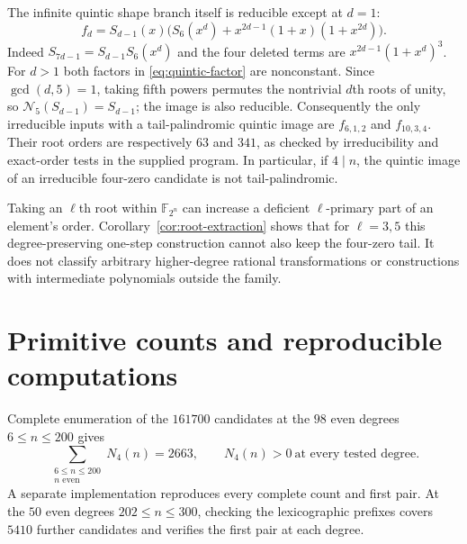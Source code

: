 \documentclass[11pt]{article}
\theoremstyle{definition}
\theoremstyle{remark}
\begin{document}
The infinite quintic shape branch itself is reducible except at $d=1$:
\begin{equation}\label{eq:quintic-factor}
 f_d=S_{d-1}(x)
       \bigl(S_6(x^d)+x^{2d-1}(1+x)(1+x^{2d})\bigr).
\end{equation}
Indeed $S_{7d-1}=S_{d-1}S_6(x^d)$ and the four deleted terms are
$x^{2d-1}(1+x^d)^3$.
For $d>1$ both factors in \eqref{eq:quintic-factor} are nonconstant.
Since $\gcd(d,5)=1$, taking fifth powers permutes the nontrivial
$d$th roots of unity, so
$\mathcal N_5(S_{d-1})=S_{d-1}$; the image is also reducible.
Consequently the only irreducible inputs with a tail-palindromic
quintic image are $f_{6,1,2}$ and $f_{10,3,4}$.
Their root orders are respectively $63$ and $341$, as checked by
irreducibility and exact-order tests in the supplied program.
In particular, if $4\mid n$, the quintic image of an irreducible
four-zero candidate is not tail-palindromic.

Taking an $\ell$th root within $\mathbb F_{2^n}$ can increase a
deficient $\ell$-primary part of an element's order.
Corollary~\ref{cor:root-extraction} shows that for $\ell=3,5$ this
degree-preserving one-step construction cannot also keep the
four-zero tail. It does not classify arbitrary higher-degree
rational transformations or constructions with intermediate
polynomials outside the family.


\section{Primitive counts and reproducible computations}\label{sec:computations}
Complete enumeration of the $161700$ candidates at the $98$ even degrees
$6\le n\le200$ gives
\[
 \sum_{\substack{6\le n\le200\\ n\text{ even}}}N_4(n)=2663,
 \qquad N_4(n)>0\ \text{at every tested degree}.
\]
A separate implementation reproduces every complete count and first pair.
At the $50$ even degrees $202\le n\le300$, checking the lexicographic
prefixes covers $5410$ further candidates and verifies the first pair
at each degree.
\end{document}
